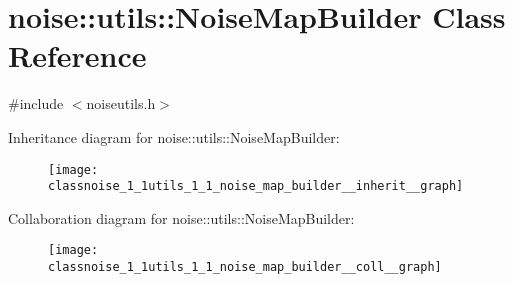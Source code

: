 \hypertarget{classnoise_1_1utils_1_1_noise_map_builder}{\section{noise\+:\+:utils\+:\+:Noise\+Map\+Builder Class Reference}
\label{classnoise_1_1utils_1_1_noise_map_builder}
}


{\ttfamily \#include $<$noiseutils.\+h$>$}



Inheritance diagram for noise\+:\+:utils\+:\+:Noise\+Map\+Builder\+:\nopagebreak
\begin{figure}[H]
\begin{center}
\leavevmode
\texttt{[image: classnoise\_1\_1utils\_1\_1\_noise\_map\_builder\_\_inherit\_\_graph]}
\end{center}
\end{figure}


Collaboration diagram for noise\+:\+:utils\+:\+:Noise\+Map\+Builder\+:\nopagebreak
\begin{figure}[H]
\begin{center}
\leavevmode
\texttt{[image: classnoise\_1\_1utils\_1\_1\_noise\_map\_builder\_\_coll\_\_graph]}
\end{center}
\end{figure}
